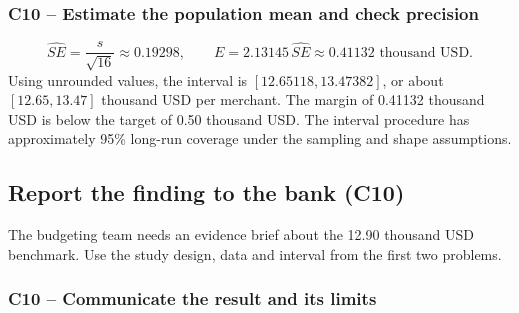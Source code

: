 
	\label{sol:c10-2-b}
	\subsubsection*{C10 -- Estimate the population mean and check precision}

	\[
	\widehat{SE}=\frac{s}{\sqrt{16}}\approx0.19298,\qquad
	E=2.13145\,\widehat{SE}\approx0.41132\text{ thousand USD}.
	\]
	Using unrounded values, the interval is $[12.65118,13.47382]$, or about $[12.65,13.47]$ thousand USD per merchant. The margin of 0.41132 thousand USD is below the target of 0.50 thousand USD. The interval procedure has approximately 95\% long-run coverage under the sampling and shape assumptions.


	\clearpage

	\subsection{Report the finding to the bank (C10)}
	\label{prob:c10-3}

	The budgeting team needs an evidence brief about the 12.90 thousand USD benchmark. Use the study design, data and interval from the first two problems.


	\label{sol:c10-3-a}
	\subsubsection*{C10 -- Communicate the result and its limits}

